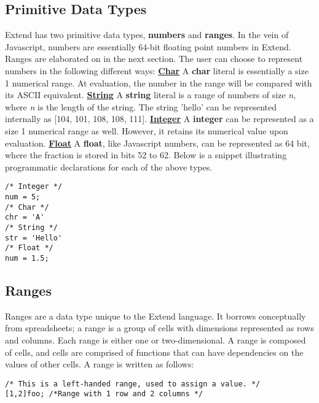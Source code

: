 	\subsection{Primitive Data Types}
		Extend has two primitive data types, \textbf{numbers} and \textbf{ranges}. In the vein of Javascript, numbers are essentially 64-bit floating point numbers in Extend. Ranges are elaborated on in the next section. The user can choose to represent numbers in the following different ways:
		\newline
		\underline{\textbf{Char}}\newline
		A \textbf{char} literal is essentially a size 1 numerical range. At evaluation, the number in the range will be compared with its ASCII equivalent.
  		\newline
		\underline{\textbf{String}}\newline
  		A \textbf{string} literal is a range of numbers of size \textit{n}, where \textit{n} is the length of the string. The string 'hello' can be represented internally as [104, 101, 108, 108, 111].
		\newline
		\underline{\textbf{Integer}}\newline
		A \textbf{integer} can be represented as a size 1 numerical range as well. However, it retains its numerical value upon evaluation. 
		\newline
		\underline{\textbf{Float}}\newline
		A \textbf{float}, like Javascript numbers, can be represented as 64 bit, where the fraction is stored in bits 52 to 62.
		\newline
		Below is a snippet illustrating programmatic declarations for each of the above types.
  		\begin{lstlisting}
/* Integer */
num = 5;
/* Char */
chr = 'A'
/* String */
str = 'Hello'
/* Float */
num = 1.5;
  		\end{lstlisting}
	\subsection{Ranges}
		Ranges are a data type unique to the Extend language. It borrows conceptually from spreadsheets; a range is a group of cells with dimensions represented as rows and columns. Each range is either one or two-dimensional. A range is composed of cells, and cells are comprised of functions that can have dependencies on the values of other cells. 
		A range is written as follows:
		\begin{lstlisting}
/* This is a left-handed range, used to assign a value. */
[1,2]foo; /*Range with 1 row and 2 columns */
		\end{lstlisting}
